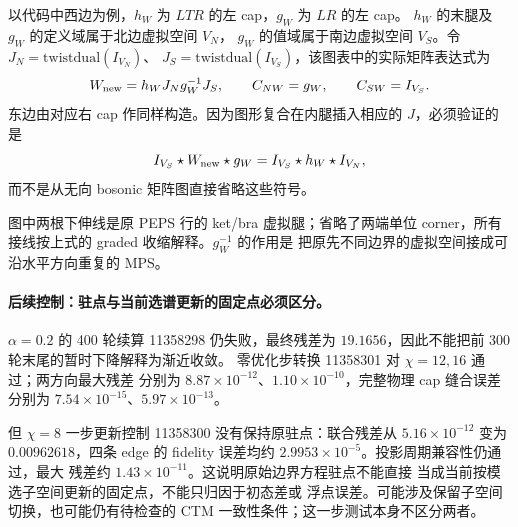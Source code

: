 以代码中西边为例，$h_W$ 为 $LTR$ 的左 cap，$g_W$ 为 $LR$ 的左 cap。
$h_W$ 的末腿及 $g_W$ 的定义域属于北边虚拟空间 $V_N$，
$g_W$ 的值域属于南边虚拟空间 $V_S$。令
$J_N=\mathrm{twistdual}(I_{V_N})$、
$J_S=\mathrm{twistdual}(I_{V_S})$，该图表中的实际矩阵表达式为
\[
 W_{\rm new}=h_W J_N g_W^{-1}J_S,\qquad
 C_{NW}=g_W,\qquad C_{SW}=I_{V_S}.
\]
东边由对应右 cap 作同样构造。因为图形复合在内腿插入相应的
$J$，必须验证的是
\[
 I_{V_S}\star W_{\rm new}\star g_W
   = I_{V_S}\star h_W\star I_{V_N},
\]
而不是从无向 bosonic 矩阵图直接省略这些符号。
\begin{center}
\end{center}
图中两根下伸线是原 PEPS 行的 ket/bra 虚拟腿；省略了两端单位
corner，所有接线按上式的 graded 收缩解释。$g_W^{-1}$ 的作用是
把原先不同边界的虚拟空间接成可沿水平方向重复的 MPS。


\paragraph{后续控制：驻点与当前选谱更新的固定点必须区分。}
$\alpha=0.2$ 的 400 轮续算 11358298 仍失败，最终残差为
$19.1656$，因此不能把前 300 轮末尾的暂时下降解释为渐近收敛。
零优化步转换 11358301 对 $\chi=12,16$ 通过；两方向最大残差
分别为 $8.87\times10^{-12}$、$1.10\times10^{-10}$，完整物理 cap
缝合误差分别为 $7.54\times10^{-15}$、$5.97\times10^{-13}$。

但 $\chi=8$ 一步更新控制 11358300 没有保持原驻点：联合残差从
$5.16\times10^{-12}$ 变为 $0.00962618$，四条 edge 的 fidelity
误差均约 $2.9953\times10^{-5}$。投影周期兼容性仍通过，最大
残差约 $1.43\times10^{-11}$。这说明原始边界方程驻点不能直接
当成当前按模选子空间更新的固定点，不能只归因于初态差或
浮点误差。可能涉及保留子空间切换，也可能仍有待检查的 CTM
一致性条件；这一步测试本身不区分两者。

